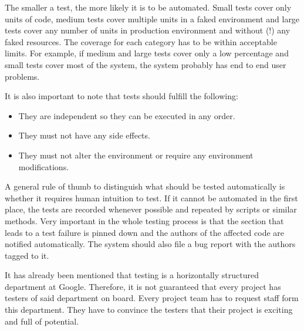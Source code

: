     The smaller a test, the more likely it is to be automated. Small tests cover only units of code, medium tests cover multiple units in a faked environment 
    and large tests cover any number of units in production environment and without (!) any faked resources. The coverage for each category has to be within acceptable limits.
    For example, if medium and large tests cover only a low percentage and small tests cover most of the system, the system probably has end to end user problems. 

    It is also important to note that tests should fulfill the following:
    \begin{itemize}
        \item  They are independent so they can be executed in any order.
        \item  They must not have any side effects.
        \item  They must not alter the environment or require any environment modifications.
    \end{itemize}

    A general rule of thumb to distinguish what should be tested automatically is whether it requires human intuition to test. 
    If it cannot be automated in the first place, the tests are recorded whenever possible and repeated by scripts or similar methods. 
    Very important in the whole testing process is that the section that leads to a test failure is pinned down 
    and the authors of the affected code are notified automatically. The system should also file a bug report with the authors tagged to it.

    It has already been mentioned that testing is a horizontally structured department at Google. 
    Therefore, it is not guaranteed that every project has testers of said department on board. Every project team has to request staff form this department. They have to convince the testers that their project is exciting and full of potential. 

